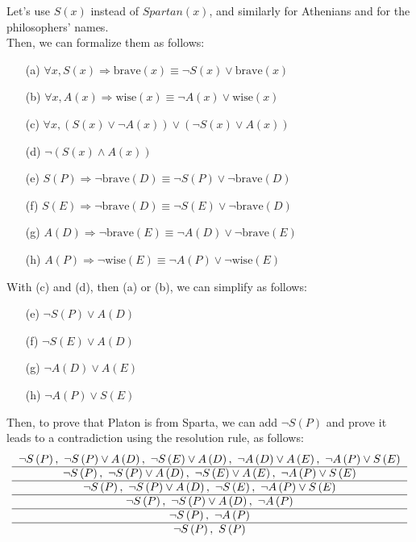 \documentclass[10pt,a4paper]{article}
\newcommand{\Ra}{\Rightarrow}
\begin{document}
Let's use $S(x)$ instead of $Spartan(x)$, and similarly for Athenians and for the philosophers' names.\\

Then, we can formalize them as follows:
\newcommand{\Sx}{S\left(x\right)}
\newcommand{\Ax}{A\left(x\right)}
\newcommand{\SD}{S\left(D\right)}
\newcommand{\SE}{S\left(E\right)}
\newcommand{\SP}{S\left(P\right)}
\newcommand{\AD}{A\left(D\right)}
\renewcommand{\AE}{A\left(E\right)}
\newcommand{\AP}{A\left(P\right)}
\newcommand{\B}[1]{\text{brave}\left(#1\right)}
\newcommand{\W}[1]{\text{wise}\left(#1\right)}

\begin{itemize}
\item[(a)] $\forall{x}, \Sx\Ra\B{x} \equiv \neg\Sx\lor\B{x}$
\item[(b)] $\forall{x}, \Ax\Ra\W{x} \equiv \neg\Ax\lor\W{x}$
\item[(c)] $\forall{x}, \left( \Sx\lor\neg\Ax \right) \lor \left( \neg\Sx\lor\Ax \right)$
\item[(d)] $\neg \left( \Sx\land\Ax \right)$
\item[(e)] $\SP \Ra \neg\B{D} \equiv \neg\SP\lor\neg\B{D}$
\item[(f)] $\SE \Ra \neg\B{D} \equiv \neg\SE\lor\neg\B{D}$
\item[(g)] $\AD \Ra \neg\B{E} \equiv \neg\AD\lor\neg\B{E}$
\item[(h)] $\AP \Ra \neg\W{E} \equiv \neg\AP\lor\neg\W{E}$
\end{itemize}
\bigskip

With (c) and (d), then (a) or (b), we can simplify as follows:
\begin{itemize}
\item[(e)] $\neg\SP\lor\AD$
\item[(f)] $\neg\SE\lor\AD$
\item[(g)] $\neg\AD\lor\AE$
\item[(h)] $\neg\AP\lor\SE$
\end{itemize}
\bigskip

Then, to prove that Platon is from Sparta, we can add $\neg\SP$ and prove it leads to a contradiction using the resolution rule, as follows:
\begin{equation*}
\begin{tabular}{c}
$\neg\SP,~\neg\SP\lor\AD,~\neg\SE\lor\AD,~\neg\AD\lor\AE,~\neg\AP\lor\SE$ \\
\hline
$\neg\SP,~\neg\SP\lor\AD,~\neg\SE\lor\AE,~\neg\AP\lor\SE$ \\
\hline
$\neg\SP,~\neg\SP\lor\AD,~\neg\SE,~\neg\AP\lor\SE$ \\
\hline
$\neg\SP,~\neg\SP\lor\AD,~\neg\AP$ \\
\hline
$\neg\SP,~\neg\AP$ \\
\hline
$\neg\SP,~\SP$ \\
\end{tabular}
\end{equation*}
\end{document}
